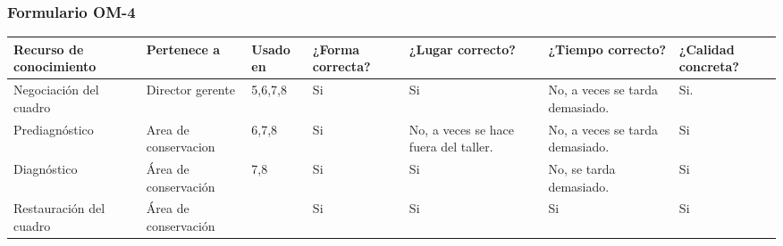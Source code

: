 \documentclass[a4paper,11pt]{article}
\begin{document}
			\newpage
			\begin{landscape}
			\subsubsection{Formulario OM-4}
			\begin{center}
				\begin{tabular}{| p{5cm} | p{2.4cm} | p{2cm} | p{2cm} | p{2cm} | p{2cm} |
				p{2cm} |}
					\hline
					\textbf{Recurso de conocimiento} & \textbf{Pertenece a} & \textbf{Usado en} & \textbf{¿Forma correcta?} & \textbf{¿Lugar correcto?} &
					\textbf{¿Tiempo correcto?} & \textbf{¿Calidad concreta?}\\
					\hline
Negociación del cuadro
& Director gerente
& 5,6,7,8
& Si
& Si
& No, a veces se tarda demasiado. 
& Si.\\
					\hline
Prediagnóstico 
& Area de conservacion
& 6,7,8
& Si
& No, a veces se hace fuera del taller.
& No, a veces se tarda demasiado. 
& Si\\
					\hline
Diagnóstico
& Área de conservación
& 7,8
& Si
& Si
& No, se tarda demasiado.
& Si\\
					\hline
Restauración del cuadro
& Área de conservación
& 
& Si
& Si
& Si
& Si\\
					\hline
				\end{tabular}
			\end{center}
			\end{landscape}
			\newpage
\end{document}
